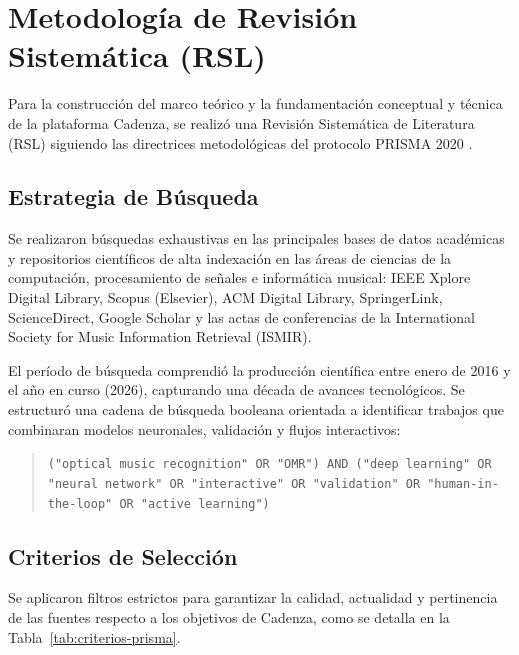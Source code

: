 \section{Metodolog\'ia de Revisi\'on Sistem\'atica (RSL)}
\label{sec:metodologia-rsl}

Para la construcci\'on del marco te\'orico y la fundamentaci\'on conceptual y t\'ecnica de la plataforma Cadenza, se realiz\'o una Revisi\'on Sistem\'atica de Literatura (RSL) siguiendo las directrices metodol\'ogicas del protocolo PRISMA 2020 \cite{prisma2020}.

\subsection{Estrategia de B\'usqueda}
\label{sec:estrategia-busqueda}

Se realizaron b\'usquedas exhaustivas en las principales bases de datos acad\'emicas y repositorios cient\'ificos de alta indexaci\'on en las \'areas de ciencias de la computaci\'on, procesamiento de se\~nales e inform\'atica musical: IEEE Xplore Digital Library, Scopus (Elsevier), ACM Digital Library, SpringerLink, ScienceDirect, Google Scholar y las actas de conferencias de la International Society for Music Information Retrieval (ISMIR).

El per\'iodo de b\'usqueda comprendi\'o la producci\'on cient\'ifica entre enero de 2016 y el a\~no en curso (2026), capturando una d\'ecada de avances tecnol\'ogicos. Se estructur\'o una cadena de b\'usqueda booleana orientada a identificar trabajos que combinaran modelos neuronales, validaci\'on y flujos interactivos:

\begin{quote}
\footnotesize
\texttt{("optical music recognition" OR "OMR") AND ("deep learning" OR "neural network" OR "interactive" OR "validation" OR "human-in-the-loop" OR "active learning")}
\end{quote}

\subsection{Criterios de Selecci\'on}
\label{sec:criterios-seleccion}

Se aplicaron filtros estrictos para garantizar la calidad, actualidad y pertinencia de las fuentes respecto a los objetivos de Cadenza, como se detalla en la Tabla~\ref{tab:criterios-prisma}.

